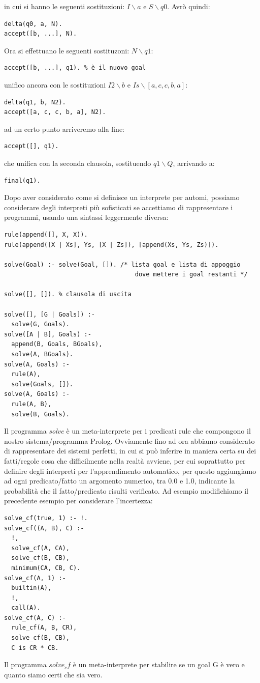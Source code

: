 \documentclass[a4paper]{book}
\begin{document}
in cui si hanno le seguenti sostituzioni: $I\backslash a$ e $S\backslash q0$.\newline
Avrò quindi:
\begin{verbatim}
delta(q0, a, N).
accept([b, ...], N).
\end{verbatim}
Ora si effettuano le seguenti sostituzoni: $N\backslash q1$:
\begin{verbatim}
accept([b, ...], q1). % è il nuovo goal
\end{verbatim}
unifico ancora con le sostituzioni $I2\backslash b$ e $Is\backslash [a,c,c,b,a]$:
\begin{verbatim}
delta(q1, b, N2).
accept([a, c, c, b, a], N2).
\end{verbatim}
ad un certo punto arriveremo alla fine:
\begin{verbatim}
accept([], q1).
\end{verbatim}
che unifica con la seconda clausola, sostituendo $q1\backslash Q$, arrivando a:
\begin{verbatim}
final(q1).
\end{verbatim}
Dopo aver considerato come si definisce un interprete per automi, possiamo considerare degli interpreti più sofisticati
se accettiamo di rappresentare i programmi, usando una sintassi leggermente diversa:
\begin{verbatim}
rule(append([], X, X)).
rule(append([X | Xs], Ys, [X | Zs]), [append(Xs, Ys, Zs)]).

solve(Goal) :- solve(Goal, []). /* lista goal e lista di appoggio
                                    dove mettere i goal restanti */

solve([], []). % clausola di uscita

solve([], [G | Goals]) :-
  solve(G, Goals).
solve([A | B], Goals) :-
  append(B, Goals, BGoals),
  solve(A, BGoals).
solve(A, Goals) :-
  rule(A),
  solve(Goals, []).
solve(A, Goals) :-
  rule(A, B),
  solve(B, Goals).
\end{verbatim}
Il programma \textit{solve} è un meta-interprete per i predicati rule che compongono il nostro sistema/programma Prolog.
Ovviamente fino ad ora abbiamo considerato di rappresentare dei sistemi perfetti, in cui si può inferire in maniera certa su dei fatti/regole
cosa che difficilmente nella realtà avviene, per cui soprattutto per definire degli interpreti per l'apprendimento automatico, per questo
aggiungiamo ad ogni predicato/fatto un argomento numerico, tra 0.0 e 1.0,
indicante la probabilità che il fatto/predicato risulti verificato.\newline
Ad esempio modifichiamo il precedente esempio per considerare l'incertezza:
\begin{verbatim}
solve_cf(true, 1) :- !.
solve_cf((A, B), C) :-
  !,
  solve_cf(A, CA),
  solve_cf(B, CB),
  minimum(CA, CB, C).
solve_cf(A, 1) :-
  builtin(A),
  !,
  call(A).
solve_cf(A, C) :-
  rule_cf(A, B, CR),
  solve_cf(B, CB),
  C is CR * CB.
\end{verbatim}
Il programma $solve_cf$ è un meta-interprete per stabilire se un goal G è vero e quanto siamo certi che sia vero.
\end{document}
